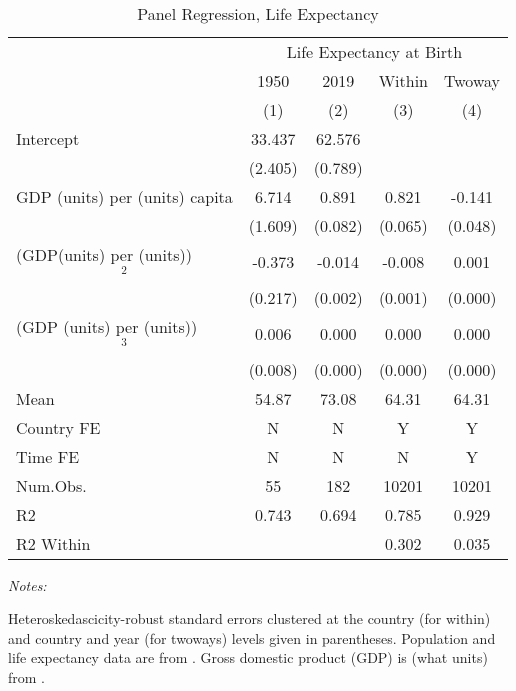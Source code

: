 \begin{table}[H]

\caption{Panel Regression, Life Expectancy \label{tab:lepanelregs}}
\centering
\begin{threeparttable}
\begin{tabular}[t]{lcccc}
\toprule
\multicolumn{1}{c}{ } & \multicolumn{4}{c}{Life Expectancy at Birth} \\
\cmidrule(l{3pt}r{3pt}){2-5}
\multicolumn{1}{c}{ } & \multicolumn{1}{c}{1950} & \multicolumn{1}{c}{2019} & \multicolumn{1}{c}{Within} & \multicolumn{1}{c}{Twoway} \\
\cmidrule(l{3pt}r{3pt}){2-2} \cmidrule(l{3pt}r{3pt}){3-3} \cmidrule(l{3pt}r{3pt}){4-4} \cmidrule(l{3pt}r{3pt}){5-5}
  & (1) & (2) & (3) & (4)\\
\midrule
Intercept & 33.437 & 62.576 &  & \\
 & (2.405) & (0.789) &  & \\
GDP (units) per (units) capita & 6.714 & 0.891 & 0.821 & -0.141\\
 & (1.609) & (0.082) & (0.065) & (0.048)\\
(GDP(units) per (units))$$^2$$ & -0.373 & -0.014 & -0.008 & 0.001\\
 & (0.217) & (0.002) & (0.001) & (0.000)\\
(GDP (units) per (units))$$^3$$ & 0.006 & 0.000 & 0.000 & 0.000\\
 & (0.008) & (0.000) & (0.000) & (0.000)\\
\midrule
Mean & 54.87 & 73.08 & 64.31 & 64.31\\
Country FE & N & N & Y & Y\\
Time FE & N & N & N & Y\\
Num.Obs. & 55 & 182 & 10201 & 10201\\
R2 & 0.743 & 0.694 & 0.785 & 0.929\\
R2 Within &  &  & 0.302 & 0.035\\
\bottomrule
\end{tabular}
\begin{tablenotes}
\item \textit{Notes: } 
\item Heteroskedascicity-robust standard errors clustered at the country (for within) and country and year (for twoways) levels given in parentheses. Population and life expectancy data are from \citet{undesaWorldPopulationProspects2022}. Gross domestic product (GDP) is (what units) from \citet{feenstraNextGenerationPenn2015}.
\end{tablenotes}
\end{threeparttable}
\end{table}

